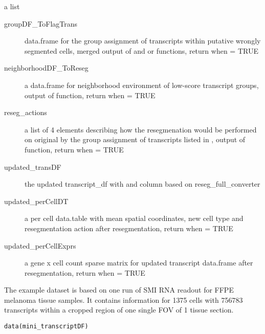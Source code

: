 \documentclass[letterpaper]{book}
\begin{document}
\begin{Value}
a list
\begin{description}

\item[groupDF\_ToFlagTrans] data.frame for the group assignment of transcripts within putative wrongly segmented cells, merged output of  and  or  functions, return when  = TRUE
\item[neighborhoodDF\_ToReseg] a data.frame for neighborhood environment of low-score transcript groups, output of  function, return when  = TRUE
\item[reseg\_actions] a list of 4 elements describing how the resegmenation would be performed on original  by the group assignment of transcripts listed in , output of  function, return when  = TRUE
\item[updated\_transDF] the updated transcript\_df with  and  column based on reseg\_full\_converter
\item[updated\_perCellDT] a per cell data.table with mean spatial coordinates, new cell type and resegmentation action after resegmentation, return when  = TRUE
\item[updated\_perCellExprs] a gene x cell count sparse matrix for updated transcript data.frame after resegmentation, return when  = TRUE

\end{description}

\end{Value}
%
\begin{Description}
The example dataset is based on one run of SMI RNA readout for FFPE melanoma tissue samples. It contains information for 1375 cells with 756783 transcripts within a cropped region of one single FOV of 1 tissue section.
\end{Description}
%
\begin{Usage}
\begin{verbatim}
data(mini_transcriptDF)
\end{verbatim}
\end{Usage}
\end{document}
